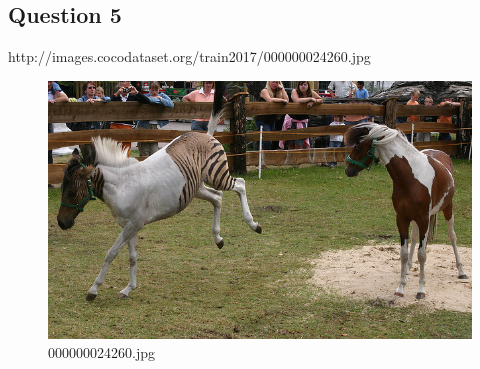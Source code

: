 \subsection*{Question 5}
http://images.cocodataset.org/train2017/000000024260.jpg
    \begin{figure}[h]
        \centering
        \includegraphics[width=0.8\linewidth]{../image set/easy/000000024260.jpg}
        \caption{000000024260.jpg}
    \end{figure}
